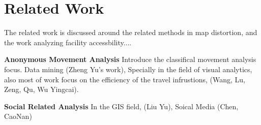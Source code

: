 \section{Related Work}

The related work is discussed around the related methods in map distortion, and the work analyzing facility accessbility....

\textbf{Anonymous Movement Analysis} Introduce the classifical movement analysis focus. Data mining (Zheng Yu's work), Specially in the field of visual analytics, also most of work focus on the efficiency of the travel infrustions, (Wang, Lu, Zeng, Qu, Wu Yingcai). 

\textbf{Social Related Analysis} In the GIS field, (Liu Yu), Soical Media (Chen, CaoNan)






